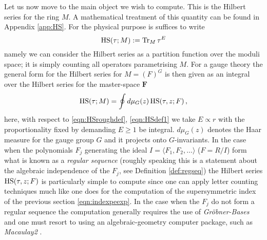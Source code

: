 \documentclass[main.tex]{subfiles}
\begin{document}
Let us now move to the main object we wish to compute.  This is the Hilbert series for the ring $M$.  A mathematical treatment of this quantity can be found in Appendix \ref{app:HS}.  For the physical purpose is suffices to write
\begin{equation}\label{eqn:HSroughdef}
\textrm{HS}(\tau;M):=\operatorname{Tr}_M\tau^E
\end{equation}
namely we can consider the Hilbert series as a partition function over the moduli space; it is simply counting all operators parametrising $M$.
For a gauge theory the general form for the Hilbert series for $M=(F)^G$ is then given as an integral over the Hilbert series for the master-space $\mathbf{F}$
\begin{equation}
\textrm{HS}(\tau;M)=\oint d\mu_G(z)\, \textrm{HS}(\tau,z;F)\,,
\end{equation}
here, with respect to \eqref{eqn:HSroughdef}, \eqref{eqn:HSdef1} we take $E\propto r$ with the proportionality fixed by demanding $E\geq1$ be integral.  $d\mu_G(z)$ denotes the Haar measure for the gauge group $G$ and it projects onto $G$-invariants.
In the case when the polynomials $F_j$ generating the ideal $I=\langle F_1,F_2,\dots\rangle$ ($F=R/I$) form what is known as a \textit{regular sequence} (roughly speaking this is a statement about the algebraic independence of the $F_j$, see Definition \ref{def:regseq}) the Hilbert series $\textrm{HS}(\tau,z;F)$ is particularly simple to compute since one can apply letter counting techniques much like one does for the computation of the supersymmetric index of the previous section \eqref{eqn:indexpeexp}.  In the case when the $F_j$ do not form a regular sequence the computation generally requires the use of \textit{Gr\"obner-Bases} and one must resort to using an algebraic-geometry computer package, such as \textit{Macaulay2} \cite{M2}.  
\end{document}
